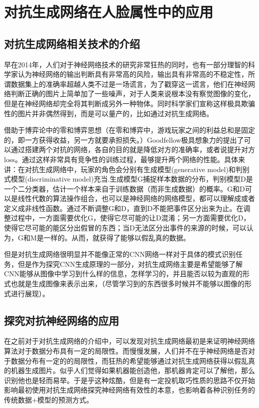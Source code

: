 \chapter{对抗生成网络在人脸属性中的应用}
\section{对抗生成网络相关技术的介绍}
早在2014年，人们对于神经网络技术的研究非常狂热的同时，也有一部分理智的科学家认为神经网络的输出判断具有非常高的风险，输出具有非常高的不稳定性，所谓数据集上的准确率超越人类不过是一场谎言，为了戳穿这一谎言，他们在神经网络判断正确的图片上简单加了一些噪声，对于人类来说根本没有察觉图像的变化，但是在神经网络却完全将其判断成另外一种物体。同时科学家们宣称这样极具欺骗性的图片并非偶然得到，而是可以量产的，比如通过对抗生成网络。

借助于博弈论中的零和博弈思想（在零和博弈中，游戏玩家之间的利益总和是固定的，即一方获得收益，另一方就要承担损失。）Goodfellow极具想象力的提出了可以通过搭建两个对抗的网络，各自的目的就是降低对方的准确率，或者说提升对方loss。通过这样非常具有竞争性的训练过程，最够提升两个网络的性能。具体来讲：在对抗生成网络中，玩家的角色会分别有生成模型(generative model)和判别式模型(discriminative model)充当.生成模型G捕捉样本数据的分布，判别模型D是一个二分类器，估计一个样本来自于训练数据（而非生成数据）的概率。G和D可以是线性代数的算法操作组合，也可以是神经网络的网络模型，都可以理解成或者定义成非线性函数。通过不断调整G和D，直到D不能把事件区分出来为止。在调整过程中，一方面需要优化G，使得它尽可能的让D混淆；另一方面需要优化D，使得它尽可能的能区分出假冒的东西；当D无法区分出事件的来源的时候，可以认为，G和M是一样的。从而，就获得了能够以假乱真的数据。

但是对抗生成网络很明显并不能像正常的CNN网络一样对于具体的模式识别任务，但是作为探究CNN生成原理的一部分，对抗生成网络主要是希望能够了解CNN能够从图像中学习到什么样的信息，怎样学习的，并且能否以较为直观的形式也就是生成图像来表示出来，（尽管学习到的东西很多时候并不能够以图像的形式进行展现）。
\section{探究对抗神经网络的应用}
在之前对于对抗生成网络的介绍中，可以发现对抗生成网络最初是来证明神经网络算法对于数据分布具有一定的局限性。而慢慢发展，人们并不在乎神经网络是否对于数据分布有一定的的局限性，而狂热的希望能够通过对抗生成网络获得以假乱真的机器生成图片。似乎人们觉得如果机器能创造他，那机器肯定可以了解他，那么识别他也是轻而易举。于是乎这种炫酷，但是有一定投机取巧性质的思路不仅开始影响最初使用对抗生成网络探究神经网络有效性的本意，也影响着各种识别任务的传统数据+模型的预测方式。

